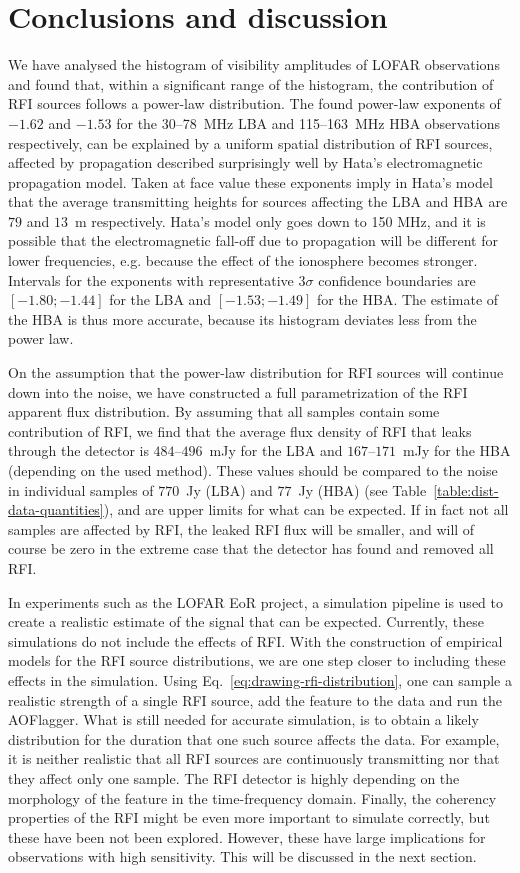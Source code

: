 \documentclass[useAMS,usenatbib]{mn2e}
\begin{document}
\section{Conclusions and discussion} \label{sec:dist-discussion}
We have analysed the histogram of visibility amplitudes of LOFAR observations and found that, within a significant range of the histogram, the contribution of RFI sources follows a power-law distribution. The found power-law exponents of $-1.62$ and $-1.53$ for the 30--78~MHz LBA and 115--163~MHz HBA observations respectively, can be explained by a uniform spatial distribution of RFI sources, affected by propagation described surprisingly well by Hata's electromagnetic propagation model. Taken at face value these exponents imply in Hata's model that the average transmitting heights for sources affecting the LBA and HBA are $79$ and $13$~m respectively. Hata's model only goes down to 150 MHz, and it is possible that the electromagnetic fall-off due to propagation will be different for lower frequencies, e.g. because the effect of the ionosphere becomes stronger. Intervals for the exponents with representative $3\sigma$ confidence boundaries are $[-1.80;-1.44]$ for the LBA and $[-1.53;-1.49]$ for the HBA. The estimate of the HBA is thus more accurate, because its histogram deviates less from the power law.

On the assumption that the power-law distribution for RFI sources will continue down into the noise, we have constructed a full parametrization of the RFI apparent flux distribution. By assuming that all samples contain some contribution of RFI, we find that the average flux density of RFI that leaks through the detector is $484$--$496$~mJy for the LBA and $167$--$171$~mJy for the HBA (depending on the used method). These values should be compared to the noise in individual samples of $770$~Jy (LBA) and $77$~Jy (HBA) (see Table~\ref{table:dist-data-quantities}), and are upper limits for what can be expected. If in fact not all samples are affected by RFI, the leaked RFI flux will be smaller, and will of course be zero in the extreme case that the detector has found and removed all RFI.

In experiments such as the LOFAR EoR project, a simulation pipeline is used to create a realistic estimate of the signal that can be expected. Currently, these simulations do not include the effects of RFI. With the construction of empirical models for the RFI source distributions, we are one step closer to including these effects in the simulation. Using Eq.~\eqref{eq:drawing-rfi-distribution}, one can sample a realistic strength of a single RFI source, add the feature to the data and run the AOFlagger. What is still needed for accurate simulation, is to obtain a likely distribution for the duration that one such source affects the data. For example, it is neither realistic that all RFI sources are continuously transmitting nor that they affect only one sample. The RFI detector is highly depending on the morphology of the feature in the time-frequency domain. Finally, the coherency properties of the RFI might be even more important to simulate correctly, but these have been not been explored. However, these have large implications for observations with high sensitivity. This will be discussed in the next section. 
\end{document}
